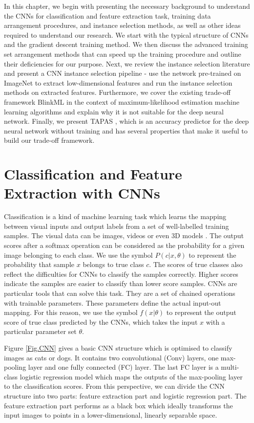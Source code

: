 In this chapter, we begin with presenting the necessary background to understand the CNNs for classification and feature extraction task, training data arrangement procedures, and instance selection methods, as well as other ideas required to understand our research. We start with the typical structure of CNNs and the gradient descent training method. We then discuss the advanced training set arrangement methods that can speed up the training procedure and outline their deficiencies for our purpose. Next, we review the instance selection literature and present a CNN instance selection pipeline - use the network pre-trained on ImageNet to extract low-dimensional features and run the instance selection methods on extracted features. Furthermore, we cover the existing trade-off framework BlinkML \cite{Park2019a} in the context of maximum-likelihood estimation machine learning algorithms and explain why it is not suitable for the deep neural network. Finally, we present TAPAS \cite{Istrate2019}, which is an accuracy predictor for the deep neural network without training and has several properties that make it useful to build our trade-off framework.


\section{Classification and Feature Extraction with CNNs}
\label{slcnn}
Classification is a kind of machine learning task which learns the mapping between visual inputs and output labels from a set of well-labelled training samples. The visual data can be images, videos or even 3D models \cite{Song2020}. The output scores after a softmax operation can be considered as the probability for a given image belonging to each class. We use the symbol $P(c|x, \theta)$ to represent the probability that sample $x$ belongs to true class $c$. The scores of true classes also reflect the difficulties for CNNs to classify the samples correctly. Higher scores indicate the samples are easier to classify than lower score samples. CNNs are particular tools that can solve this task. They are a set of chained operations with trainable parameters. These parameters define the actual input-out mapping. For this reason, we use the symbol $f(x|\theta)$ to represent the output score of true class predicted by the CNNs, which takes the input $x$ with a particular parameter set $\theta$. 

Figure \ref{Fig.CNN} gives a basic CNN structure which is optimised to classify images as cats or dogs. It contains two convolutional (Conv) layers, one max-pooling layer and one fully connected (FC) layer. The last FC layer is a multi-class logistic regression model which maps the outputs of the max-pooling layer to the classification scores. From this perspective, we can divide the CNN structure into two parts: feature extraction part and logistic regression part. The feature extraction part performs as a black box which ideally transforms the input images to points in a lower-dimensional, linearly separable space. 

